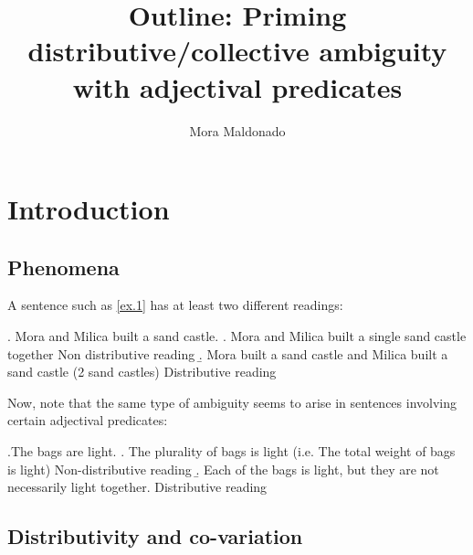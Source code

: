 \documentclass[a4paper]{article}
\title{Outline: Priming distributive/collective ambiguity with adjectival predicates}
\author{Mora Maldonado}
\begin{document}
\maketitle

\section{Introduction}



\subsection{Phenomena}



A sentence such as \ref{ex.1} has at least two different readings:

\ex. Mora and Milica built a sand castle. \label{ex.1}
\a. Mora and Milica built a single sand castle together \hfill{Non distributive reading}
\b. Mora built a sand castle and Milica built a sand castle (2 sand castles) \hfill{Distributive reading}


Now, note that the same type of ambiguity seems to arise in sentences involving certain adjectival predicates:

\ex.The bags are light. \label{ex.2}
\a. The plurality of bags is light (i.e. The total weight of bags is light) \hfill{Non-distributive reading} 
\b. Each of the bags is light, but they are not necessarily light together. \hfill{Distributive reading}


\subsection{Distributivity and co-variation}
\end{document}
